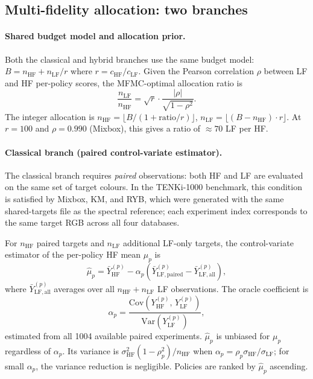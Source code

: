 \documentclass[twoside,twocolumn,9pt]{article}
\begin{document}
\subsection{Multi-fidelity allocation: two branches}

\paragraph{Shared budget model and allocation prior.}
Both the classical and hybrid branches use the same budget model: $B = n_\mathrm{HF} + n_\mathrm{LF}/r$ where $r = c_\mathrm{HF}/c_\mathrm{LF}$.  Given the Pearson correlation $\rho$ between LF and HF per-policy scores, the MFMC-optimal allocation ratio is\cite{Peherstorfer2018SurveyMF}
\[
\frac{n_\mathrm{LF}}{n_\mathrm{HF}} = \sqrt{r} \cdot \frac{|\rho|}{\sqrt{1 - \rho^2}}.
\]
The integer allocation is $n_\mathrm{HF} = \lfloor B / (1 + \mathrm{ratio}/r) \rfloor$, $n_\mathrm{LF} = \lfloor (B - n_\mathrm{HF}) \cdot r \rfloor$.  At $r = 100$ and $\rho = 0.990$ (Mixbox), this gives a ratio of $\approx 70$ LF per HF.

\paragraph{Classical branch (paired control-variate estimator).}
\label{sec:classical_branch}
The classical branch requires \emph{paired} observations: both HF and LF are evaluated on the same set of target colours.  In the TENKi-1000 benchmark, this condition is satisfied by Mixbox, KM, and RYB, which were generated with the same shared-targets file as the spectral reference; each experiment index corresponds to the same target RGB across all four databases.

For $n_\mathrm{HF}$ paired targets and $n_\mathrm{LF}$ additional LF-only targets, the control-variate estimator of the per-policy HF mean $\mu_p$ is
\[
\hat{\mu}_p = \bar{Y}^{(p)}_{\mathrm{HF}} - \alpha_p \!\left(\bar{Y}^{(p)}_{\mathrm{LF,paired}} - \bar{Y}^{(p)}_{\mathrm{LF,all}}\right),
\]
where $\bar{Y}^{(p)}_\mathrm{LF,all}$ averages over all $n_\mathrm{HF} + n_\mathrm{LF}$ LF observations.  The oracle coefficient is
\[
\alpha_p = \frac{\mathrm{Cov}(Y_\mathrm{HF}^{(p)},\, Y_\mathrm{LF}^{(p)})}{\mathrm{Var}(Y_\mathrm{LF}^{(p)})},
\]
estimated from all 1004 available paired experiments.  $\hat{\mu}_p$ is unbiased for $\mu_p$ regardless of $\alpha_p$.  Its variance is $\sigma^2_\mathrm{HF}(1-\rho_p^2)/n_\mathrm{HF}$ when $\alpha_p = \rho_p \sigma_\mathrm{HF}/\sigma_\mathrm{LF}$; for small $\alpha_p$, the variance reduction is negligible.  Policies are ranked by $\hat{\mu}_p$ ascending.
\end{document}
